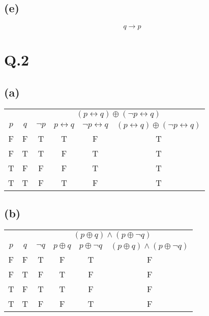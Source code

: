 \documentclass[a4paper,12pt]{article}
\begin{document}
\subsection*{(e)}
\begin{equation*}
	q \to p
\end{equation*}

\section*{Q.2}

\subsection*{(a)}
\begin{center}
	\begin{tabular}{cccccc}
		\toprule
		 & & \multicolumn{4}{c}{$(p \leftrightarrow q) \oplus (\neg p \leftrightarrow q)$}\\
		 \cmidrule(lr){3-6}
		$p$ & $q$ & $\neg p$ & $p \leftrightarrow q$ & $\neg p \leftrightarrow q$ & $(p \leftrightarrow q) \oplus (\neg p \leftrightarrow q)$ \\
		\midrule
		F & F & T & T & F & T\\
		F & T & T & F & T & T\\
		T & F & F & F & T & T\\
		T & T & F & T & F & T\\
		\bottomrule
	\end{tabular}
\end{center}

\subsection*{(b)}
\begin{center}
	\begin{tabular}{cccccc}
		\toprule
		& & \multicolumn{4}{c}{$(p \oplus q) \wedge (p \oplus \neg q)$}\\
		\cmidrule(lr){3-6}
		$p$ & $q$ & $\neg q$ & $p \oplus q$ & $p \oplus \neg q$ & $(p \oplus q) \wedge (p \oplus \neg q)$ \\
		\midrule
		F & F & T & F & T & F\\
		F & T & F & T & F & F\\
		T & F & T & T & F & F\\
		T & T & F & F & T & F\\
		\bottomrule
	\end{tabular}
\end{center}
\end{document}
